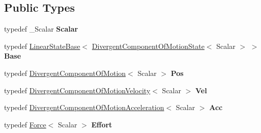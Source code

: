 \subsection*{Public Types}
\begin{DoxyCompactItemize}
\item 
typedef \+\_\+\+Scalar {\bfseries Scalar}\hypertarget{classow__core_1_1DivergentComponentOfMotionState_aa1e90b99e69d416a107aa9e9a6dafc96}{}\label{classow__core_1_1DivergentComponentOfMotionState_aa1e90b99e69d416a107aa9e9a6dafc96}

\item 
typedef \hyperlink{classow__core_1_1LinearStateBase}{Linear\+State\+Base}$<$ \hyperlink{classow__core_1_1DivergentComponentOfMotionState}{Divergent\+Component\+Of\+Motion\+State}$<$ Scalar $>$ $>$ {\bfseries Base}\hypertarget{classow__core_1_1DivergentComponentOfMotionState_a7f3d720364834ceab27205bccb69c884}{}\label{classow__core_1_1DivergentComponentOfMotionState_a7f3d720364834ceab27205bccb69c884}

\item 
typedef \hyperlink{classow__core_1_1DivergentComponentOfMotion}{Divergent\+Component\+Of\+Motion}$<$ Scalar $>$ {\bfseries Pos}\hypertarget{classow__core_1_1DivergentComponentOfMotionState_afcc64f31c09e0c2770d803dcaa4250aa}{}\label{classow__core_1_1DivergentComponentOfMotionState_afcc64f31c09e0c2770d803dcaa4250aa}

\item 
typedef \hyperlink{classow__core_1_1DivergentComponentOfMotionVelocity}{Divergent\+Component\+Of\+Motion\+Velocity}$<$ Scalar $>$ {\bfseries Vel}\hypertarget{classow__core_1_1DivergentComponentOfMotionState_a06dd0dcfadebaedd75666ad9b49bade7}{}\label{classow__core_1_1DivergentComponentOfMotionState_a06dd0dcfadebaedd75666ad9b49bade7}

\item 
typedef \hyperlink{classow__core_1_1DivergentComponentOfMotionAcceleration}{Divergent\+Component\+Of\+Motion\+Acceleration}$<$ Scalar $>$ {\bfseries Acc}\hypertarget{classow__core_1_1DivergentComponentOfMotionState_ac5b89d0f686395e466156b8a0b16b215}{}\label{classow__core_1_1DivergentComponentOfMotionState_ac5b89d0f686395e466156b8a0b16b215}

\item 
typedef \hyperlink{classow__core_1_1Force}{Force}$<$ Scalar $>$ {\bfseries Effort}\hypertarget{classow__core_1_1DivergentComponentOfMotionState_ade6c0e449b7c2e89c614348974c02fc6}{}\label{classow__core_1_1DivergentComponentOfMotionState_ade6c0e449b7c2e89c614348974c02fc6}

\end{DoxyCompactItemize}
